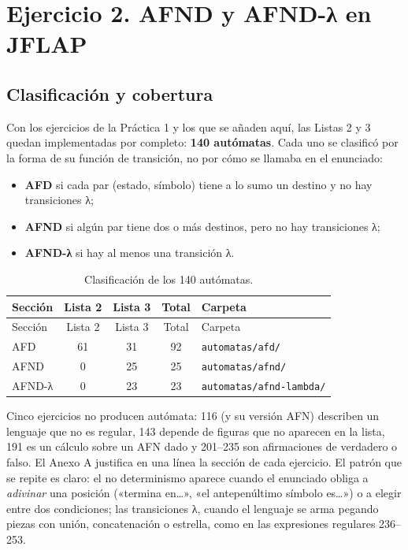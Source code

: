 \hypertarget{ejercicio-2.-afnd-y-afnd-ux3bb-en-jflap}{%
\section{Ejercicio 2. AFND y AFND-λ en JFLAP}\label{ejercicio-2.-afnd-y-afnd-ux3bb-en-jflap}}

\hypertarget{clasificaciuxf3n-y-cobertura}{%
\subsection{Clasificación y cobertura}\label{clasificaciuxf3n-y-cobertura}}

Con los ejercicios de la Práctica 1 y los que se añaden aquí, las Listas 2 y 3 quedan implementadas por completo: \textbf{140 autómatas}. Cada uno se clasificó por la forma de su función de transición, no por cómo se llamaba en el enunciado:

\begin{itemize}
\tightlist
\item
  \textbf{AFD} si cada par (estado, símbolo) tiene a lo sumo un destino y no hay transiciones λ;
\item
  \textbf{AFND} si algún par tiene dos o más destinos, pero no hay transiciones λ;
\item
  \textbf{AFND-λ} si hay al menos una transición λ.
\end{itemize}

\begin{longtable}[]{@{}lcccl@{}}
\caption{Clasificación de los 140 autómatas.}\tabularnewline
\toprule\noalign{}
Sección & Lista 2 & Lista 3 & Total & Carpeta \\
\midrule\noalign{}
\endfirsthead
\toprule\noalign{}
Sección & Lista 2 & Lista 3 & Total & Carpeta \\
\midrule\noalign{}
\endhead
\bottomrule\noalign{}
\endlastfoot
AFD & 61 & 31 & 92 & \texttt{automatas/afd/} \\
AFND & 0 & 25 & 25 & \texttt{automatas/afnd/} \\
AFND-λ & 0 & 23 & 23 & \texttt{automatas/afnd-lambda/} \\
\end{longtable}

Cinco ejercicios no producen autómata: 116 (y su versión AFN) describen un lenguaje que no es regular, 143 depende de figuras que no aparecen en la lista, 191 es un cálculo sobre un AFN dado y 201--235 son afirmaciones de verdadero o falso. El Anexo A justifica en una línea la sección de cada ejercicio. El patrón que se repite es claro: el no determinismo aparece cuando el enunciado obliga a \emph{adivinar} una posición («termina en\ldots», «el antepenúltimo símbolo es\ldots») o a elegir entre dos condiciones; las transiciones λ, cuando el lenguaje se arma pegando piezas con unión, concatenación o estrella, como en las expresiones regulares 236--253.

